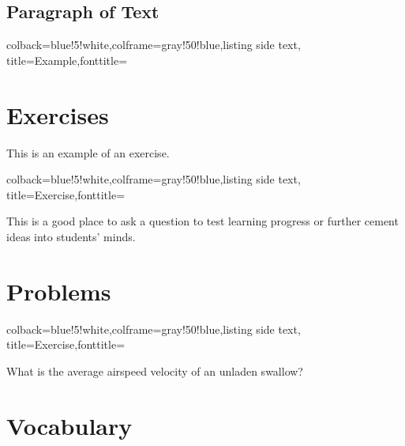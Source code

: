 \subsection{Paragraph of Text}

\begin{tcblisting}{colback=blue!5!white,colframe=gray!50!blue,listing side text,  title=Example,fonttitle=\bfseries}
\begin{example}
\lipsum[1]
\end{example}
\end{tcblisting}


\section{Exercises}

This is an example of an exercise.

\begin{tcblisting}{colback=blue!5!white,colframe=gray!50!blue,listing side text,  title=Exercise,fonttitle=\bfseries}
\begin{exercise}
This is a good place to ask a question to test learning progress or further cement ideas into students' minds.
\end{exercise}
\end{tcblisting}


\section{Problems}

\begin{tcblisting}{colback=blue!5!white,colframe=gray!50!blue,listing side text,  title=Exercise,fonttitle=\bfseries}
\begin{problem}
What is the average airspeed velocity of an unladen swallow?
\end{problem}
\end{tcblisting}


\section{Vocabulary}

